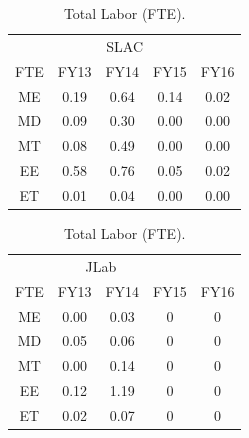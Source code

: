\begin{table}[htdp]
\caption{Total Labor (FTE).}
\begin{center}
\parbox{.45\linewidth}{
\begin{tabular}{c||cccc}
\multicolumn{5}{c}{SLAC}\\
 FTE	&FY13	&FY14	&FY15&	FY16\\
 \hline\hline
ME	&0.19	&0.64&	0.14&	0.02\\
MD&	0.09	&0.30&	0.00&	0.00\\
MT&	0.08	&0.49&	0.00	&0.00\\
EE &	0.58	&0.76&	0.05	&0.02\\
ET&	0.01	&0.04&	0.00	&0.00\\
\end{tabular}
}
\parbox{.45\linewidth}{
\begin{tabular}{c||cccc}
\multicolumn{4}{c}{JLab}\\
 FTE	&FY13	&FY14	&	FY15&FY16\\
 \hline\hline
ME	&0.00	&0.03&	0&0 \\
MD&	0.05	&0.06&	0 &0\\
MT&	0.00	&0.14& 0&0\\
EE &	0.12	&1.19&0&0\\
ET&	0.02	&0.07&0&0\\
\end{tabular}
}
\end{center}
\label{tb:engin}
\end{table}%

